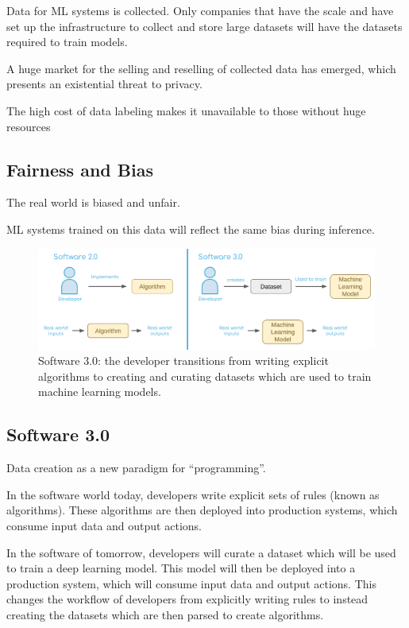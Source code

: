 \documentclass{article}
\begin{document}
Data for ML systems is collected. Only companies that have the scale and have set up the infrastructure to collect and store large datasets will have the datasets required to train models.

A huge market for the selling and reselling of collected data has emerged, which presents an existential threat to privacy.

The high cost of data labeling makes it unavailable to those without huge resources


\subsection{Fairness and Bias}

The real world is biased and unfair.

ML systems trained on this data will reflect the same bias during inference.

\begin{figure}
	\centering
	\includegraphics[width=\textwidth]{software3.png}
	\caption{Software 3.0: the developer transitions from writing explicit algorithms to creating and curating datasets which are used to train machine learning models.}
	\label{fig:fig2}
\end{figure}

\subsection{Software 3.0}
\label{sec:software3.0}

Data creation as a new paradigm for “programming”.

In the software world today, developers write explicit sets of rules (known as algorithms). These algorithms are then deployed into production systems, which consume input data and output actions.

In the software of tomorrow, developers will curate a dataset which will be used to train a deep learning model. This model will then be deployed into a production system, which will consume input data and output actions. This changes the workflow of developers from explicitly writing rules to instead creating the datasets which are then parsed to create algorithms.
\end{document}
